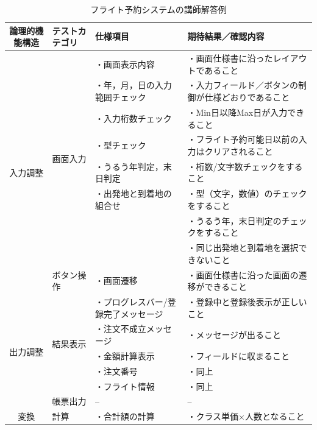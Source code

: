 \begin{table}[htbp]
\footnotesize
  \centering
  \caption{フライト予約システムの講師解答例}
    \begin{tabular}{|c|l|p{10.5em}|p{13em}|}
    \hline
    \multicolumn{1}{|p{7em}|}{論理的機能構造} & \multicolumn{1}{p{7em}|}{テストカテゴリ} & 仕様項目  & 期待結果／確認内容 \bigstrut\\
    \hline
    \hline
    \multicolumn{1}{|c|}{\multirow{9}[4]{*}{入力調整}} & \multicolumn{1}{l|}{\multirow{8}[2]{*}{画面入力}} & ・画面表示内容 & ・画面仕様書に沿ったレイアウトであること \bigstrut[t]\\
          &       & ・年，月，日の入力範囲チェック & ・入力フィールド／ボタンの制御が仕様どおりであること \\
          &       & ・入力桁数チェック & ・Min日以降Max日が入力できること\\
          &       & ・型チェック & ・フライト予約可能日以前の入力はクリアされること\\
          &       & ・うるう年判定，末日判定 & ・桁数/文字数チェックをすること\\
          &       & ・出発地と到着地の組合せ & ・型（文字，数値）のチェックをすること\\
          &       & \multicolumn{1}{r|}{} & ・うるう年，末日判定のチェックをすること \\
          &       & \multicolumn{1}{r|}{} & ・同じ出発地と到着地を選択できないこと \bigstrut[b]\\
\cline{2-4}          & \multicolumn{1}{p{7.75em}|}{ボタン操作} & ・画面遷移 & ・画面仕様書に沿った画面の遷移ができること \bigstrut\\
    \hline
    \multicolumn{1}{|c|}{\multirow{6}[4]{*}{出力調整}} & \multicolumn{1}{l|}{\multirow{5}[2]{*}{結果表示}} & ・プログレスバー/登録完了メッセージ & ・登録中と登録後表示が正しいこと \bigstrut[t]\\
          &       & ・注文不成立メッセージ & ・メッセージが出ること \\
          &       & ・金額計算表示 & ・フィールドに収まること \\
          &       & ・注文番号 & ・同上 \\
          &       & ・フライト情報 & ・同上\bigstrut[b]\\
\cline{2-4}          & \multicolumn{1}{p{7.75em}|}{帳票出力} & --    & -- \bigstrut\\
    \hline
    \multicolumn{1}{|c|}{\multirow{3}[2]{*}{変換}} & \multicolumn{1}{l|}{\multirow{4}[2]{*}{計算}} & ・合計額の計算 & ・クラス単価×人数となること \bigstrut[t]\\

\end{tabular}
\end{table}
